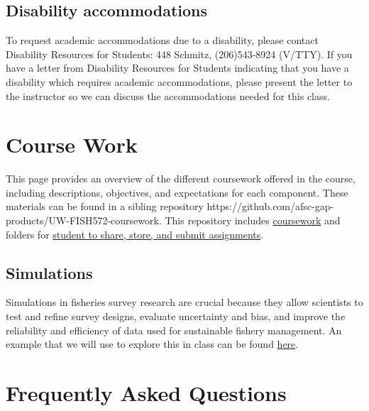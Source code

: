 \documentclass[
  letterpaper,
  oneside,
  open=any]{scrbook}
\begin{document}
\section{Disability accommodations}\label{disability-accommodations}

To request academic accommodations due to a disability, please contact
Disability Resources for Students: 448 Schmitz, (206)543-8924 (V/TTY).
If you have a letter from Disability Resources for Students indicating
that you have a disability which requires academic accommodations,
please present the letter to the instructor so we can discuss the
accommodations needed for this class.


\chapter{Course Work}\label{course-work}

This page provides an overview of the different coursework offered in
the course, including descriptions, objectives, and expectations for
each component. These materials can be found in a sibling repository
https://github.com/afsc-gap-products/UW-FISH572-coursework. This
repository includes
\href{https://github.com/afsc-gap-products/UW-FISH572-coursework/tree/main/coursework}{coursework}
and folders for
\href{https://github.com/afsc-gap-products/UW-FISH572-coursework/tree/main/studentwork}{student
to share, store, and submit assignments}.

\section{Simulations}\label{simulations}

Simulations in fisheries survey research are crucial because they allow
scientists to test and refine survey designs, evaluate uncertainty and
bias, and improve the reliability and efficiency of data used for
sustainable fishery management. An example that we will use to explore
this in class can be found
\href{https://github.com/afsc-gap-products/UW-FISH572-coursework/tree/main/coursework/simulations}{here}.


\chapter{Frequently Asked Questions}\label{frequently-asked-questions}
\end{document}
